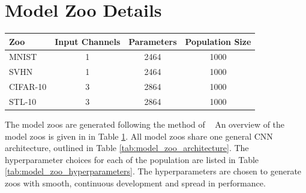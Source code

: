 \section{Model Zoo Details}
\label{app:zoos}
\begin{table}
\vspace{-6mm}
\small
{}\label{tab:zoo_overview}\vspace{2mm}
\begin{tabular}{@{}lccc@{}}
\toprule
\textbf{Zoo} & \textbf{Input Channels} & \textbf{Parameters} & \textbf{Population Size} \\ 
\midrule
MNIST        & 1                       & 2464                & 1000                     \\
SVHN         & 1                       & 2464                & 1000                     \\
CIFAR-10     & 3                       & 2864                & 1000                     \\
STL-10       & 3                       & 2864                & 1000                     \\ 
\bottomrule
\end{tabular}
\vspace{-4mm}
\end{table} 
The model zoos are generated following the method of ~\citep{schurholtSelfSupervisedRepresentationLearning2021,schurholtModelZoosDataset2022}
An overview of the model zoos is given in in Table \ref{tab:zoo_overview}.
All model zoos share one general CNN architecture, outlined in Table \ref{tab:model_zoo_architecture}. 
The hyperparameter choices for each of the population are listed in Table \ref{tab:model_zoo_hyperparameters}. 
The hyperparameters are chosen to generate zoos with smooth, continuous development and spread in performance. 


